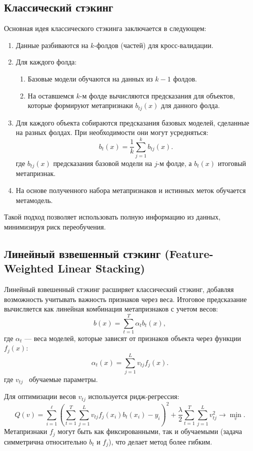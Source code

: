 \subsection*{Классический стэкинг}


Основная идея классического стэкинга заключается в следующем:
\begin{enumerate}
    \item Данные разбиваются на \( k \)-фолдов (частей) для кросс-валидации.
    \item Для каждого фолда:
    \begin{enumerate}
        \item Базовые модели обучаются на данных из \( k-1 \) фолдов.
        \item На оставшемся \( k \)-м фолде вычисляются предсказания для объектов, которые формируют метапризнаки \( b_{tj}(x) \) для данного фолда.
    \end{enumerate}
    \item Для каждого объекта собираются предсказания базовых моделей, сделанные на разных фолдах. При необходимости они могут усредняться:
    \[
    b_t(x) = \frac{1}{k} \sum_{j=1}^k b_{tj}(x).
    \]
     где \( b_{tj}(x) \) \textemdash предсказания базовой модели на \( j \)-м фолде, а \( b_t(x) \) \textemdash итоговый метапризнак.
    \item На основе полученного набора метапризнаков и истинных меток обучается метамодель.
\end{enumerate}

Такой подход позволяет использовать полную информацию из данных, минимизируя риск переобучения. 



\subsection*{Линейный взвешенный стэкинг (Feature-Weighted Linear Stacking)}

Линейный взвешенный стэкинг расширяет классический стэкинг, добавляя возможность учитывать важность признаков через веса. Итоговое предсказание вычисляется как линейная комбинация метапризнаков с учетом весов:
\[
    b(x) = \sum_{t=1}^T \alpha_t b_t(x),
\]
где \( \alpha_t \) — веса моделей, которые зависят от признаков объекта через функции \( f_j(x) \):
\[
    \alpha_t(x) = \sum_{j=1}^L v_{tj} f_j(x).
\]
где \( v_{tj} \) \textemdash~обучаемые параметры.


Для оптимизации весов \( v_{tj} \) используется ридж-регрессия:
\[
Q(v) = \sum_{i=1}^\ell \left( \sum_{t=1}^T \sum_{j=1}^L v_{tj} f_j(x_i) b_t(x_i) - y_i \right)^2 + \frac{\lambda}{2} \sum_{t=1}^T \sum_{j=1}^L v_{tj}^2 \to \min_v.
\]
Метапризнаки \( f_j \) могут быть как фиксированными, так и обучаемыми (задача симметрична относительно \( b_t \) и \( f_j \)), что делает метод более гибким.

